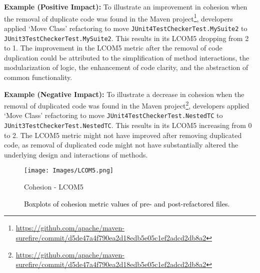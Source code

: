 \noindent\textbf{Example (Positive Impact):} To illustrate an improvement in cohesion when the removal of duplicate code was found in the Maven project\footnote{\textcolor{black}{\url{https://github.com/apache/maven-surefire/commit/d5de47a4f790ea2d18edb5e05c1ef2adcd2db8a2}}}, developers applied `Move Class' refactoring to move \texttt{JUnit4TestCheckerTest.MySuite2} to \texttt{JUnit3TestCheckerTest.MySuite2}. This results in its LCOM5 dropping from 2 to 1. The improvement in the LCOM5 metric after the removal of code duplication could be attributed to the simplification of method interactions, the modularization of logic, the enhancement of code clarity, and the abstraction of common functionality.

\noindent\textbf{Example (Negative Impact):} To illustrate a decrease in cohesion when the removal of duplicated code was found in the Maven project\footnote{\textcolor{black}{\url{https://github.com/apache/maven-surefire/commit/d5de47a4f790ea2d18edb5e05c1ef2adcd2db8a2}}}, developers applied `Move Class' refactoring to move \texttt{JUnit4TestCheckerTest.NestedTC} to \texttt{JUnit3TestChecker\break Test.NestedTC}. This results in its LCOM5 increasing from 0 to 2. The LCOM5 metric might not have improved after removing duplicated code, as removal of duplicated code might not have substantially altered the underlying design and interactions of methods.  


\begin{figure*}
\centering
\centering\texttt{[image: Images/LCOM5.png]}
\caption{Cohesion - LCOM5}
\label{BP:chesion-lcom}
\caption{\textcolor{black}{Boxplots of cohesion metric values of pre- and post-refactored files.}}
\label{Chart:Boxplots_cohesion}
\end{figure*}

